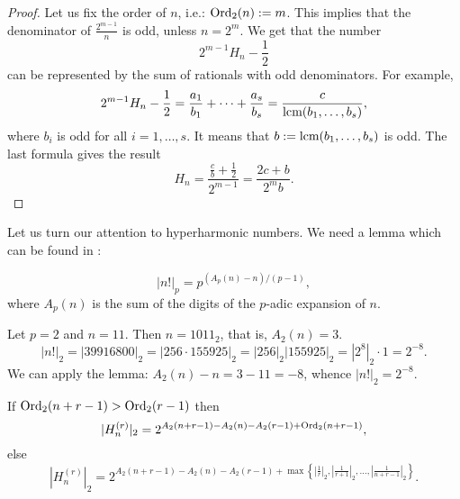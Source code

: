 \documentclass[a4paper,12pt]{amsart}
\begin{document}
\begin{proof}Let us fix the order of $n$, i.e.: ${\mathop{\textup{Ord}}\nolimits}_2(n):=m$. This implies that the denominator of $\frac{2^{m-1}}{n}$ is odd, unless $n=2^m$. We get that the number
\[2^{m-1}H_n-\frac{1}{2}\]
can be represented by the sum of rationals with odd denominators. For example,
\[2^{m-1}H_n-\frac{1}{2}=\frac{a_1}{b_1}+\cdots+\frac{a_s}{b_s}=\frac{c}{{\mathop{\textup{lcm}}\nolimits}(b_1,\dots,b_s)},\]
where $b_i$ is odd for all $i=1,\dots,s$. It means that $b:={\mathop{\textup{lcm}}\nolimits}(b_1,\dots,b_s)$ is odd. The last formula gives the result
\[H_n=\frac{\frac{c}{b}+\frac{1}{2}}{2^{m-1}}=\frac{2c+b}{2^m b}.\]
\end{proof}

Let us turn our attention to hyperharmonic numbers. We need a lemma which can be found in \cite{BS}:

\begin{Lemma}
\[|n!|_p=p^{(A_p(n)-n)/(p-1)},\]
where $A_p(n)$ is the sum of the digits of the $p$-adic expansion of $n$.
\end{Lemma}

\begin{Example} Let $p=2$ and $n=11$. Then $n=1011_2$, that is, $A_2(n)=3$.
\[|n!|_2=|39916800|_2=|256\cdot155925|_2=|256|_2|155925|_2=|2^8|_2\cdot1=2^{-8}.\]
We can apply the lemma: $A_2(n)-n=3-11=-8$, whence $|n!|_2=2^{-8}$.
\end{Example}

\begin{Theorem} If ${\mathop{\textup{Ord}}\nolimits}_2(n+r-1)>{\mathop{\textup{Ord}}\nolimits}_2(r-1)$ then
\[|H_n^{(r)}|_2=2^{A_2(n+r-1)-A_2(n)-A_2(r-1)+{\mathop{\textup{Ord}}\nolimits}_2(n+r-1)},\]
else
\[|H_n^{(r)}|_2=2^{A_2(n+r-1)-A_2(n)-A_2(r-1)+\max\left\{\left|\frac{1}{r}\right|_2,\left|\frac{1}{r+1}\right|_2,\dots,\left|\frac{1}{n+r-1}\right|_2\right\}}.\]
\end{Theorem}
\end{document}
